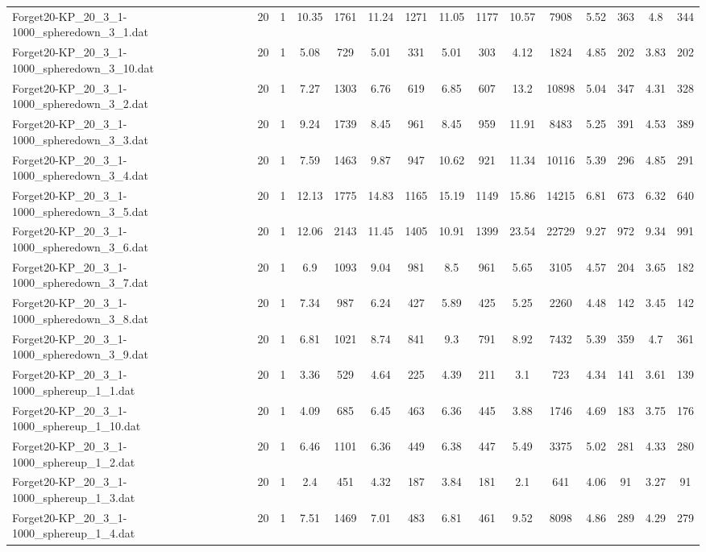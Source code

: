 \begin{table}[!ht]
{\begin{tabular}{lcccccccccccccc}
Forget20-KP\_20\_3\_1-1000\_spheredown\_3\_1.dat & 20 & 1 & 10.35 & 1761 & 11.24 & 1271 & 11.05 & 1177 & 10.57 & 7908 & 5.52 & 363 & 4.8 & 344 \\
Forget20-KP\_20\_3\_1-1000\_spheredown\_3\_10.dat & 20 & 1 & 5.08 & 729 & 5.01 & 331 & 5.01 & 303 & 4.12 & 1824 & 4.85 & 202 & 3.83 & 202 \\
Forget20-KP\_20\_3\_1-1000\_spheredown\_3\_2.dat & 20 & 1 & 7.27 & 1303 & 6.76 & 619 & 6.85 & 607 & 13.2 & 10898 & 5.04 & 347 & 4.31 & 328 \\
Forget20-KP\_20\_3\_1-1000\_spheredown\_3\_3.dat & 20 & 1 & 9.24 & 1739 & 8.45 & 961 & 8.45 & 959 & 11.91 & 8483 & 5.25 & 391 & 4.53 & 389 \\
Forget20-KP\_20\_3\_1-1000\_spheredown\_3\_4.dat & 20 & 1 & 7.59 & 1463 & 9.87 & 947 & 10.62 & 921 & 11.34 & 10116 & 5.39 & 296 & 4.85 & 291 \\
Forget20-KP\_20\_3\_1-1000\_spheredown\_3\_5.dat & 20 & 1 & 12.13 & 1775 & 14.83 & 1165 & 15.19 & 1149 & 15.86 & 14215 & 6.81 & 673 & 6.32 & 640 \\
Forget20-KP\_20\_3\_1-1000\_spheredown\_3\_6.dat & 20 & 1 & 12.06 & 2143 & 11.45 & 1405 & 10.91 & 1399 & 23.54 & 22729 & 9.27 & 972 & 9.34 & 991 \\
Forget20-KP\_20\_3\_1-1000\_spheredown\_3\_7.dat & 20 & 1 & 6.9 & 1093 & 9.04 & 981 & 8.5 & 961 & 5.65 & 3105 & 4.57 & 204 & 3.65 & 182 \\
Forget20-KP\_20\_3\_1-1000\_spheredown\_3\_8.dat & 20 & 1 & 7.34 & 987 & 6.24 & 427 & 5.89 & 425 & 5.25 & 2260 & 4.48 & 142 & 3.45 & 142 \\
Forget20-KP\_20\_3\_1-1000\_spheredown\_3\_9.dat & 20 & 1 & 6.81 & 1021 & 8.74 & 841 & 9.3 & 791 & 8.92 & 7432 & 5.39 & 359 & 4.7 & 361 \\
Forget20-KP\_20\_3\_1-1000\_sphereup\_1\_1.dat & 20 & 1 & 3.36 & 529 & 4.64 & 225 & 4.39 & 211 & 3.1 & 723 & 4.34 & 141 & 3.61 & 139 \\
Forget20-KP\_20\_3\_1-1000\_sphereup\_1\_10.dat & 20 & 1 & 4.09 & 685 & 6.45 & 463 & 6.36 & 445 & 3.88 & 1746 & 4.69 & 183 & 3.75 & 176 \\
Forget20-KP\_20\_3\_1-1000\_sphereup\_1\_2.dat & 20 & 1 & 6.46 & 1101 & 6.36 & 449 & 6.38 & 447 & 5.49 & 3375 & 5.02 & 281 & 4.33 & 280 \\
Forget20-KP\_20\_3\_1-1000\_sphereup\_1\_3.dat & 20 & 1 & 2.4 & 451 & 4.32 & 187 & 3.84 & 181 & 2.1 & 641 & 4.06 & 91 & 3.27 & 91 \\
Forget20-KP\_20\_3\_1-1000\_sphereup\_1\_4.dat & 20 & 1 & 7.51 & 1469 & 7.01 & 483 & 6.81 & 461 & 9.52 & 8098 & 4.86 & 289 & 4.29 & 279 \\

\end{tabular}}
\end{table}
